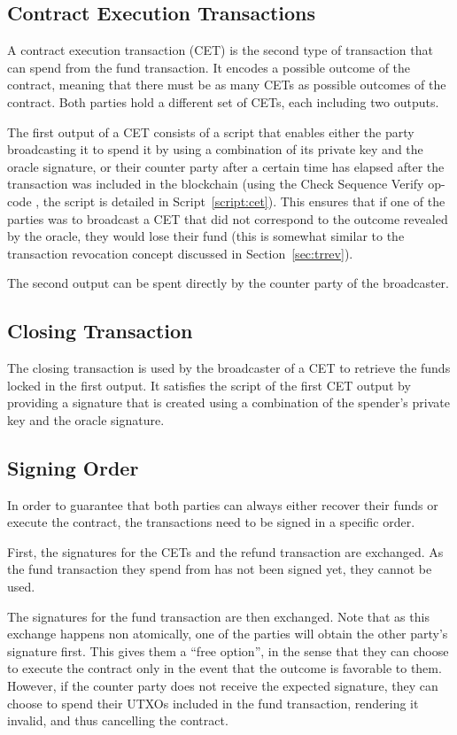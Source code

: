\subsection{Contract Execution Transactions}
A contract execution transaction (CET) is the second type of transaction that can spend from the fund transaction.
It encodes a possible outcome of the contract, meaning that there must be as many CETs as possible outcomes of the contract.
Both parties hold a different set of CETs, each including two outputs.

The first output of a CET consists of a script that enables either the party broadcasting it to spend it by using a combination of its private key and the oracle signature, or their counter party after a certain time has elapsed after the transaction was included in the blockchain (using the Check Sequence Verify op-code \cite{csv}, the script is detailed in Script~\ref{script:cet}).
This ensures that if one of the parties was to broadcast a CET that did not correspond to the outcome revealed by the oracle, they would lose their fund (this is somewhat similar to the transaction revocation concept discussed in Section~\ref{sec:trrev}).

The second output can be spent directly by the counter party of the broadcaster.

\subsection{Closing Transaction}
The closing transaction is used by the broadcaster of a CET to retrieve the funds locked in the first output.
It satisfies the script of the first CET output by providing a signature that is created using a combination of the spender’s private key and the oracle signature.

\subsection{Signing Order}
In order to guarantee that both parties can always either recover their funds or execute the contract, the transactions need to be signed in a specific order. 

First, the signatures for the CETs and the refund transaction are exchanged.
As the fund transaction they spend from has not been signed yet, they cannot be used.

The signatures for the fund transaction are then exchanged.
Note that as this exchange happens non atomically, one of the parties will obtain the other party's signature first.
This gives them a “free option”, in the sense that they can choose to execute the contract only in the event that the outcome is favorable to them.
However, if the counter party does not receive the expected signature, they can choose to spend their UTXOs included in the fund transaction, rendering it invalid, and thus cancelling the contract.


